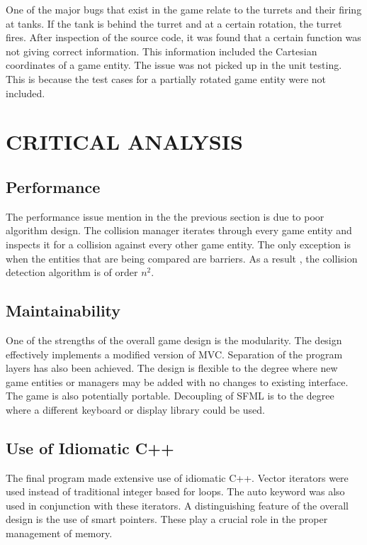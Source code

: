 \documentclass[10pt,twocolumn]{witseiepaper}
\begin{document}
One of the major bugs that exist in the game relate to the turrets and their firing at tanks. If the tank is behind the turret and at a certain rotation, the turret fires. After inspection of the source code, it was found that a certain function was not giving correct information. This information included the Cartesian coordinates of a game entity. The issue was not picked up in the unit testing. This is because the test cases for a partially rotated game entity were not included. 


%
\section{CRITICAL ANALYSIS} %

\subsection{Performance}
The performance issue mention in the the previous section is due to poor algorithm design. The collision manager iterates through every game entity and inspects it for a collision against every other game entity. The only exception is when the entities that are being compared are barriers. As a result , the collision detection algorithm is of order $ n^{2} $.


\subsection{Maintainability}
One of the strengths of the overall game design is the modularity. The design effectively implements a modified version of MVC. Separation of the program layers has also been achieved. The design is flexible to the degree where new game entities or managers may be added with no changes to existing interface. The game is also potentially portable. Decoupling of SFML is to the degree where a different keyboard or display library could be used. 

\subsection{Use of Idiomatic C++}
The final program made extensive use of idiomatic C++. Vector iterators were used instead of traditional integer based for loops. The auto keyword was also used in conjunction with these iterators. A distinguishing feature of the overall design is the use of smart pointers. These play a crucial role in the proper management of memory.
\end{document}
